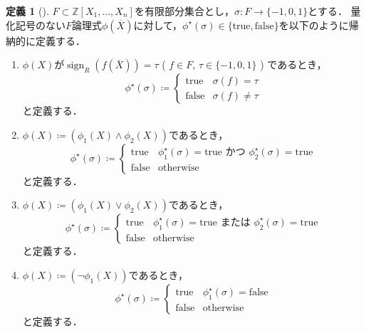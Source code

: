 \documentclass[uplatex, dvipdfmx]{jsarticle}
\numberwithin{equation}{section}
\newcommand{\Z}{\mathbb{Z}}
\newcommand{\map}[3]{{#1}\colon{#2}\rightarrow{#3}}
\newcommand{\true}{\text{true}}
\newcommand{\false}{\text{false}}
\DeclareMathOperator{\sign}{sign}
\theoremstyle{definition}
\newtheorem{definition}{定義}[section]
\begin{document}
\begin{definition}[{\cite[Notation 11.12]{MR2248869}}]
     $F \subset \Z[X_1, \dots, X_n]$を有限部分集合とし，$\map{\sigma}{F}{\{-1, 0, 1\}}$とする．
     量化記号のない$F$論理式$\phi(\overline{X})$に対して，$\phi^\star(\sigma) \in \{\true, \false\}$を以下のように帰納的に定義する．
     \begin{enumerate}
          \item $\phi(X)$が$\sign_R(f(\overline{X})) = \tau$ ( $f \in F$, $\tau \in \{-1, 0, 1\}$ ) であるとき，
          \begin{equation}
               \phi^\star(\sigma)\coloneqq \begin{cases}
                    \true  & \sigma(f)=\tau\\
                    \false & \sigma(f) \neq \tau
               \end{cases}
          \end{equation}
          と定義する．
          \item $\phi(X)\coloneqq (\phi_1(X) \land \phi_2(X))$であるとき，
          \begin{equation}
               \phi^\star(\sigma)\coloneqq \begin{cases}
                    \true  & \text{$\phi_1^\star(\sigma)=\true$ かつ $\phi_2^\star(\sigma)=\true$}\\
                    \false & \text{otherwise}
               \end{cases}
          \end{equation}
          と定義する．
          \item $\phi(X)\coloneqq (\phi_1(X) \lor \phi_2(X))$であるとき，
          \begin{equation}
               \phi^\star(\sigma)\coloneqq \begin{cases}
                    \true  & \text{$\phi_1^\star(\sigma)=\true$ または $\phi_2^\star(\sigma)=\true$}\\
                    \false & \text{otherwise}
               \end{cases}
          \end{equation}
          と定義する．
          \item $\phi(X)\coloneqq (\lnot \phi_1(X))$であるとき，
          \begin{equation}
               \phi^\star(\sigma)\coloneqq \begin{cases}
                    \true  & \text{$\phi_1^\star(\sigma)=\false$}\\
                    \false & \text{otherwise}
               \end{cases}
          \end{equation}
          と定義する．
     \end{enumerate}
\end{definition}
\end{document}

